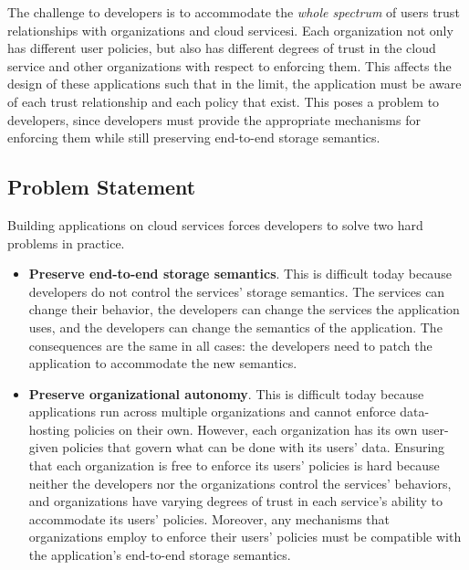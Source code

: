 The challenge to developers is to accommodate the \emph{whole spectrum} of
users trust relationships with organizations and cloud servicesi.
Each organization not only has different user
policies, but also has different degrees of trust in the cloud service and other
organizations with respect to enforcing them.
This affects the design of these applications such that in the limit,
the application must be aware of each trust relationship and each policy that
exist.  This poses a problem to developers, since developers 
must provide the appropriate mechanisms for enforcing them while still
preserving end-to-end storage semantics.

\subsection{Problem Statement}

Building applications on cloud services forces developers to solve two hard
problems in practice.

\begin{itemize}
   \item \textbf{Preserve end-to-end storage semantics}.  This is difficult
      today because developers do not
      control the services' storage semantics.  The services can change their
      behavior, the developers can change the services the application uses, and
      the developers can change the semantics of the application.
      The consequences are the same in all cases:  the developers need to patch the application to
      accommodate the new semantics.

   \item \textbf{Preserve organizational autonomy}.  This is difficult today
      because applications run across multiple organizations and cannot enforce
      data-hosting policies on their own.  However, each organization has its
      own user-given policies that govern what can be done with its users' data.
      Ensuring that each organization is free to enforce its users' policies is
      hard because neither the developers nor the organizations
      control the services' behaviors, and organizations have varying degrees of trust in
      each service's ability to accommodate its users' policies.  Moreover, any mechanisms
      that organizations employ to enforce their users' policies must be
      compatible with the application's end-to-end storage semantics.
\end{itemize}

